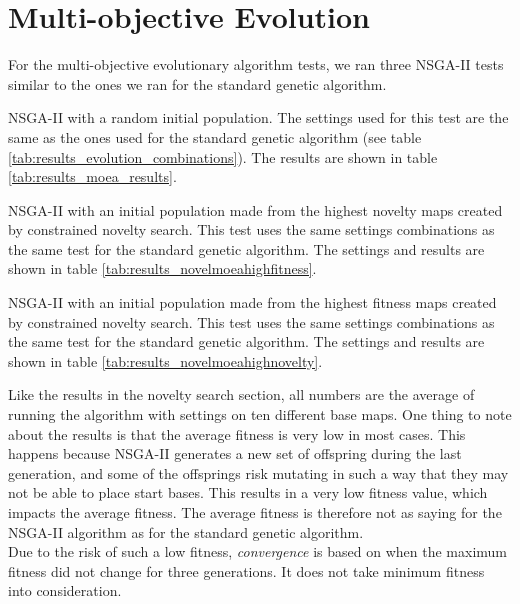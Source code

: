\section{Multi-objective Evolution}
\label{results_moea}

For the multi-objective evolutionary algorithm tests, we ran three NSGA-II tests similar to the ones we ran for the standard genetic algorithm.

\begin{my_itemize}

	\item NSGA-II with a random initial population. The settings used for this test are the same as the ones used for the standard genetic algorithm (see table \ref{tab:results_evolution_combinations}). The results are shown in table \ref{tab:results_moea_results}.

	\item NSGA-II with an initial population made from the highest novelty maps created by constrained novelty search. This test uses the same settings combinations as the same test for the standard genetic algorithm. The settings and results are shown in table \ref{tab:results_novelmoeahighfitness}.

	\item NSGA-II with an initial population made from the highest fitness maps created by constrained novelty search. This test uses the same settings combinations as the same test for the standard genetic algorithm. The settings and results are shown in table \ref{tab:results_novelmoeahighnovelty}.

\end{my_itemize}

Like the results in the novelty search section, all numbers are the average of running the algorithm with settings on ten different base maps. One thing to note about the results is that the average fitness is very low in most cases. This happens because NSGA-II generates a new set of offspring during the last generation, and some of the offsprings risk mutating in such a way that they may not be able to place start bases. This results in a very low fitness value, which impacts the average fitness. The average fitness is therefore not as saying for the NSGA-II algorithm as for the standard genetic algorithm. 
\\Due to the risk of such a low fitness, \textit{convergence} is based on when the maximum fitness did not change for three generations. It does not take minimum fitness into consideration.

